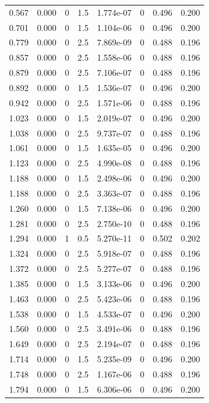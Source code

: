 \documentclass[preview]{standalone}
\begin{document}
{{\begin{tabular}{L{1.2cm}C{1.2cm} C{0.3cm}C{0.5cm} C{1.4cm}C{1.4cm} C{1.4cm}C{1.4cm}}
  0.567  &  0.000  & 0     & 1.5 &  1.774e-07  & 0  & 0.496 &  0.200   \\ 
  0.701  &  0.000  & 0     & 1.5 &  1.104e-06  & 0  & 0.496 &  0.200   \\ 
  0.779  &  0.000  & 0     & 2.5 &  7.869e-09  & 0  & 0.488 &  0.196   \\ 
  0.857  &  0.000  & 0     & 2.5 &  1.558e-06  & 0  & 0.488 &  0.196   \\ 
  0.879  &  0.000  & 0     & 2.5 &  7.106e-07  & 0  & 0.488 &  0.196   \\ 
  0.892  &  0.000  & 0     & 1.5 &  1.536e-07  & 0  & 0.496 &  0.200   \\ 
  0.942  &  0.000  & 0     & 2.5 &  1.571e-06  & 0  & 0.488 &  0.196   \\ 
  1.023  &  0.000  & 0     & 1.5 &  2.019e-07  & 0  & 0.496 &  0.200   \\ 
  1.038  &  0.000  & 0     & 2.5 &  9.737e-07  & 0  & 0.488 &  0.196   \\ 
  1.061  &  0.000  & 0     & 1.5 &  1.635e-05  & 0  & 0.496 &  0.200   \\ 
  1.123  &  0.000  & 0     & 2.5 &  4.990e-08  & 0  & 0.488 &  0.196   \\ 
  1.188  &  0.000  & 0     & 1.5 &  2.498e-06  & 0  & 0.496 &  0.200   \\ 
  1.188  &  0.000  & 0     & 2.5 &  3.363e-07  & 0  & 0.488 &  0.196   \\ 
  1.260  &  0.000  & 0     & 1.5 &  7.138e-06  & 0  & 0.496 &  0.200   \\ 
  1.281  &  0.000  & 0     & 2.5 &  2.750e-10  & 0  & 0.488 &  0.196   \\ 
  1.294  &  0.000  & 1     & 0.5 &  5.270e-11  & 0  & 0.502 &  0.202   \\ 
  1.324  &  0.000  & 0     & 2.5 &  5.918e-07  & 0  & 0.488 &  0.196   \\ 
  1.372  &  0.000  & 0     & 2.5 &  5.277e-07  & 0  & 0.488 &  0.196   \\ 
  1.385  &  0.000  & 0     & 1.5 &  3.133e-06  & 0  & 0.496 &  0.200   \\ 
  1.463  &  0.000  & 0     & 2.5 &  5.423e-06  & 0  & 0.488 &  0.196   \\ 
  1.538  &  0.000  & 0     & 1.5 &  4.533e-07  & 0  & 0.496 &  0.200   \\ 
  1.560  &  0.000  & 0     & 2.5 &  3.491e-06  & 0  & 0.488 &  0.196   \\ 
  1.649  &  0.000  & 0     & 2.5 &  2.194e-07  & 0  & 0.488 &  0.196   \\ 
  1.714  &  0.000  & 0     & 1.5 &  5.235e-09  & 0  & 0.496 &  0.200   \\ 
  1.748  &  0.000  & 0     & 2.5 &  1.167e-06  & 0  & 0.488 &  0.196   \\ 
  1.794  &  0.000  & 0     & 1.5 &  6.306e-06  & 0  & 0.496 &  0.200   \\ 
\hline 
\end{tabular} 

}}
\end{document}
